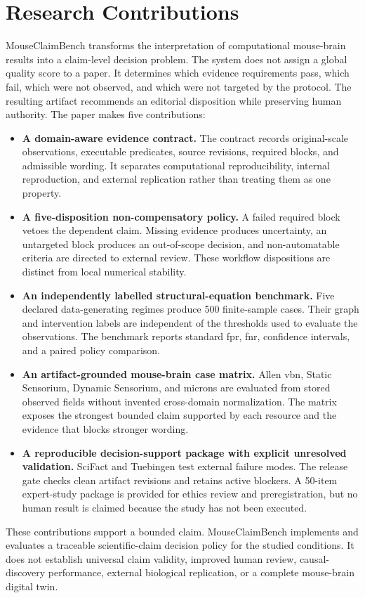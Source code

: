 \section{Research Contributions}
\label{sec:contributions}

MouseClaimBench transforms the interpretation of computational mouse-brain results into a claim-level decision problem. The system does not assign a global quality score to a paper. It determines which evidence requirements pass, which fail, which were not observed, and which were not targeted by the protocol. The resulting artifact recommends an editorial disposition while preserving human authority. The paper makes five contributions:

\begin{itemize}
    \item \textbf{A domain-aware evidence contract.} The contract records original-scale observations, executable predicates, source revisions, required blocks, and admissible wording. It separates computational reproducibility, internal reproduction, and external replication rather than treating them as one property.

    \item \textbf{A five-disposition non-compensatory policy.} A failed required block vetoes the dependent claim. Missing evidence produces uncertainty, an untargeted block produces an out-of-scope decision, and non-automatable criteria are directed to external review. These workflow dispositions are distinct from local numerical stability.

    \item \textbf{An independently labelled structural-equation benchmark.} Five declared data-generating regimes produce 500 finite-sample cases. Their graph and intervention labels are independent of the thresholds used to evaluate the observations. The benchmark reports standard \ac{fpr}, \ac{fnr}, confidence intervals, and a paired policy comparison.

    \item \textbf{An artifact-grounded mouse-brain case matrix.} Allen \ac{vbn}, Static Sensorium, Dynamic Sensorium, and \ac{microns} are evaluated from stored observed fields without invented cross-domain normalization. The matrix exposes the strongest bounded claim supported by each resource and the evidence that blocks stronger wording.

    \item \textbf{A reproducible decision-support package with explicit unresolved validation.} SciFact and Tuebingen test external failure modes. The release gate checks clean artifact revisions and retains active blockers. A 50-item expert-study package is provided for ethics review and preregistration, but no human result is claimed because the study has not been executed.
\end{itemize}

These contributions support a bounded claim. MouseClaimBench implements and evaluates a traceable scientific-claim decision policy for the studied conditions. It does not establish universal claim validity, improved human review, causal-discovery performance, external biological replication, or a complete mouse-brain digital twin.
